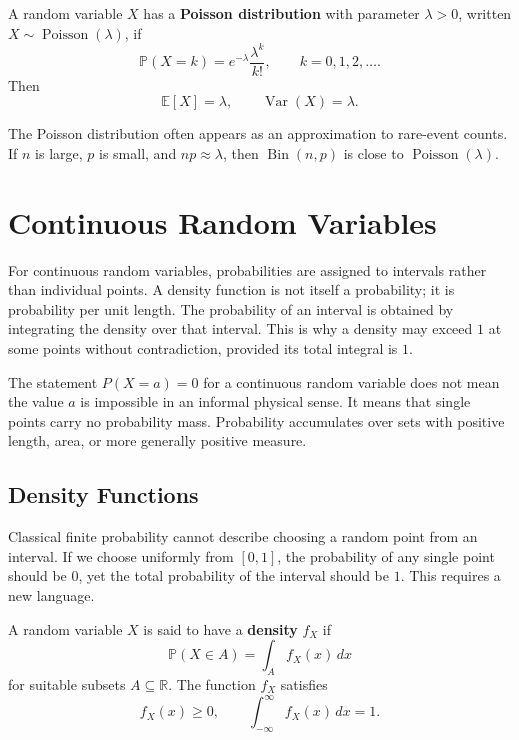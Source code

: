 \begin{definition}
A random variable $X$ has a \textbf{Poisson distribution} with parameter $\lambda>0$, written $X\sim\operatorname{Poisson}(\lambda)$, if
\[
    \mathbb{P}(X=k)=e^{-\lambda}\frac{\lambda^k}{k!},
    \qquad
    k=0,1,2,\dots.
\]
Then
\[
    \mathbb{E}[X]=\lambda,
    \qquad
    \operatorname{Var}(X)=\lambda.
\]
\end{definition}

\begin{remark}
The Poisson distribution often appears as an approximation to rare-event counts. If $n$ is large, $p$ is small, and $np\approx\lambda$, then $\operatorname{Bin}(n,p)$ is close to $\operatorname{Poisson}(\lambda)$.
\end{remark}

\section{Continuous Random Variables}


For continuous random variables, probabilities are assigned to intervals rather than individual points. A density function is not itself a probability; it is probability per unit length. The probability of an interval is obtained by integrating the density over that interval. This is why a density may exceed $1$ at some points without contradiction, provided its total integral is $1$.

The statement $P(X=a)=0$ for a continuous random variable does not mean the value $a$ is impossible in an informal physical sense. It means that single points carry no probability mass. Probability accumulates over sets with positive length, area, or more generally positive measure.

\subsection{Density Functions}

Classical finite probability cannot describe choosing a random point from an interval. If we choose uniformly from $[0,1]$, the probability of any single point should be $0$, yet the total probability of the interval should be $1$. This requires a new language.

\begin{definition}
A random variable $X$ is said to have a \textbf{density} $f_X$ if
\[
    \mathbb{P}(X\in A)=\int_A f_X(x)\,dx
\]
for suitable subsets $A\subseteq\mathbb{R}$. The function $f_X$ satisfies
\[
    f_X(x)\geq 0,
    \qquad
    \int_{-\infty}^{\infty}f_X(x)\,dx=1.
\]
\end{definition}

